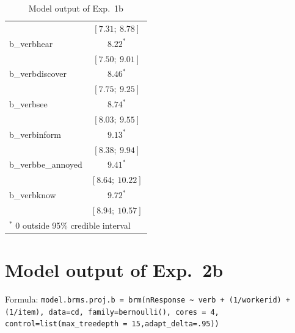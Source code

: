\documentclass[11pt,fleqn]{article}
\newcommand{\6}{\mbox{$[\hspace*{-.6mm}[$}}
\newcommand{\9}{\mbox{$]\hspace*{-.6mm}]$}}
\begin{document}
{\begin{table}
\begin{center}
\begin{tabular}{l c }
                   & $[7.31;\ 8.78]$   \\
b\_verbhear        & $8.22^{*}$        \\
                   & $[7.50;\ 9.01]$   \\
b\_verbdiscover    & $8.46^{*}$        \\
                   & $[7.75;\ 9.25]$   \\
b\_verbsee         & $8.74^{*}$        \\
                   & $[8.03;\ 9.55]$   \\
b\_verbinform      & $9.13^{*}$        \\
                   & $[8.38;\ 9.94]$   \\
b\_verbbe\_annoyed & $9.41^{*}$        \\
                   & $[8.64;\ 10.22]$  \\
b\_verbknow        & $9.72^{*}$        \\
                   & $[8.94;\ 10.57]$  \\
\hline
\multicolumn{2}{l}{\scriptsize{$^*$ 0 outside 95\% credible interval}}
\end{tabular}
\caption{Model output of Exp.~1b}
\label{table:coefficients1b}
\end{center}
\end{table}

\section{Model output of Exp.~2b}

Formula: \tiny \verb|model.brms.proj.b = brm(nResponse ~ verb + (1/workerid) + (1/item), data=cd, family=bernoulli(), cores = 4, control=list(max_treedepth = 15,adapt_delta=.95))| \normalsize

}
\end{document}
